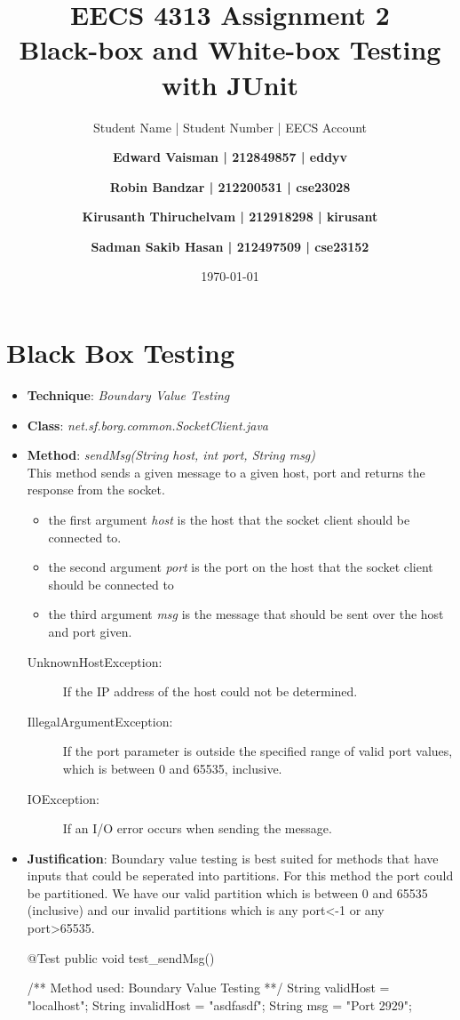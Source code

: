 \documentclass[fontsize=12pt,paper=letter,twoside]{scrartcl}
\author{Student Name | Student Number | EECS Account
\and \textbf{Edward Vaisman | 212849857 | eddyv}
\and \textbf{Robin Bandzar | 212200531 | cse23028}
\and \textbf{Kirusanth Thiruchelvam | 212918298 | kirusant}
\and \textbf{Sadman Sakib Hasan | 212497509 | cse23152}
}
\date{\today} %
\begin{document}
\title{EECS 4313 Assignment 2 \\Black-box and White-box Testing with JUnit}
\maketitle

\newpage

\tableofcontents


\newpage



\section{Black Box Testing}
\begin{itemize}
\item \textbf{Technique}: \emph{Boundary Value Testing}
\item \textbf{Class}: \emph{net.sf.borg.common.SocketClient.java}
\item \textbf{Method}: \emph{sendMsg(String host, int port, String msg)}\\
This method sends a given message to a given host, port and returns the response from the socket.
\begin{itemize}
\item the first argument \emph{host} is the host that the socket client should be connected to.
\item the second argument \emph{port} is the port on the host that the socket client should be connected to
\item the third argument \emph{msg} is the message that should be sent over the host and port given.
\end{itemize}
\begin{description}
\item[UnknownHostException:] If the IP address of the host could not be determined.
\item[IllegalArgumentException:] If the port parameter is outside the specified range of valid port values, which is between 0 and 65535, inclusive.
\item[IOException:] If an I/O error occurs when sending the message.
\end{description}
\item \textbf{Justification}: Boundary value testing is best suited for methods that have inputs that could be seperated into partitions. For this method the port could be partitioned. We have our valid partition which is between 0 and 65535 (inclusive) and our invalid partitions which is any  port\textless  -1 or any port\textgreater 65535.
\newpage
\begin{code}	@Test
	public void test_sendMsg() {
		/** Method used: Boundary Value Testing **/
		String validHost = "localhost";
		String invalidHost = "asdfasdf";
		String msg = "Port 2929";

}
\end{code}
\end{itemize}
\end{document}
